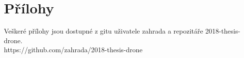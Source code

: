 \chapter{Přílohy}
\label{user-guide}
Veškeré přílohy jsou dostupné z gitu uživatele zahrada a repozitáře 2018-thesis-drone.\\
https://github.com/zahrada/2018-thesis-drone